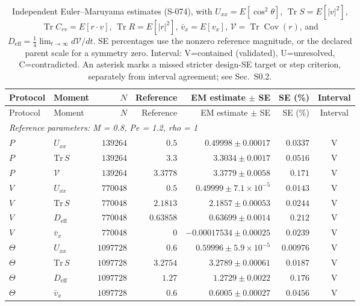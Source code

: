 \begingroup
\small
\setlength{\tabcolsep}{3pt}
\begin{longtable}{llrrrrc}
\caption{Independent Euler--Maruyama estimates (S-074), with $U_{xx}=E[\cos^2\theta]$, $\operatorname{Tr}S=E[|v|^2]$, $\operatorname{Tr}C_{rv}=E[r\cdot v]$, $\operatorname{Tr}R=E[|r|^2]$, $\bar v_x=E[v_x]$, $\mathcal V=\operatorname{Tr}\operatorname{Cov}(r)$, and $D_{\mathrm{eff}}=\tfrac14\lim_{t\to\infty}d\mathcal V/dt$. SE percentages use the nonzero reference magnitude, or the declared parent scale for a symmetry zero. Interval: V=contained (validated), U=unresolved, C=contradicted. An asterisk marks a missed stricter design-SE target or step criterion, separately from interval agreement; see Sec.~S0.2.}\label{tab:s074}\\
\hline
Protocol & Moment & $N$ & Reference & EM estimate $\pm$ SE & SE (\%) & Interval \\
\hline
\endfirsthead
\hline
Protocol & Moment & $N$ & Reference & EM estimate $\pm$ SE & SE (\%) & Interval \\
\hline
\endhead
\multicolumn{7}{l}{\textit{Reference parameters: M = 0.8, Pe = 1.2, rho = 1}} \\
$P$ & $U_{xx}$ & $139264$ & $0.5$ & $0.49998 \pm 0.00017$ & $0.0337$ & V \\
$P$ & $\mathrm{Tr}\,S$ & $139264$ & $3.3$ & $3.3034 \pm 0.0017$ & $0.0516$ & V \\
$P$ & $\mathcal V$ & $139264$ & $3.3778$ & $3.3779 \pm 0.0058$ & $0.171$ & V \\
$V$ & $U_{xx}$ & $770048$ & $0.5$ & $0.49999 \pm 7.1\times10^{-5}$ & $0.0143$ & V \\
$V$ & $\mathrm{Tr}\,S$ & $770048$ & $2.1813$ & $2.1857 \pm 0.00053$ & $0.0244$ & V \\
$V$ & $D_{\mathrm{eff}}$ & $770048$ & $0.63858$ & $0.63699 \pm 0.0014$ & $0.212$ & V \\
$V$ & $\bar v_x$ & $770048$ & $0$ & $-0.00017534 \pm 0.00025$ & $0.0239$ & V \\
$\Theta$ & $U_{xx}$ & $1097728$ & $0.6$ & $0.59996 \pm 5.9\times10^{-5}$ & $0.00976$ & V \\
$\Theta$ & $\mathrm{Tr}\,S$ & $1097728$ & $3.2754$ & $3.2789 \pm 0.00061$ & $0.0187$ & V \\
$\Theta$ & $D_{\mathrm{eff}}$ & $1097728$ & $1.27$ & $1.2729 \pm 0.0022$ & $0.176$ & V \\
$\Theta$ & $\bar v_x$ & $1097728$ & $0.6$ & $0.6005 \pm 0.00027$ & $0.0456$ & V \\

\end{longtable}
